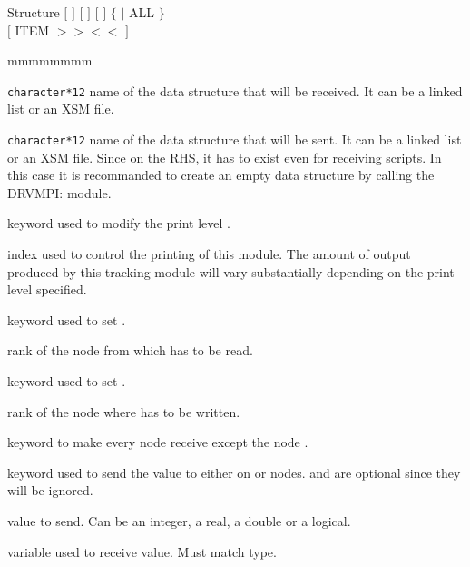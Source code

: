 \begin{DataStructure}{Structure }
$[$  \moc{:=} $]$  $[$  $]$ \moc{::} $[$   $]$     $\{$  $|$ ALL $\}$ \\ $[$ ITEM  $>>$$<<$ $]$ \moc{;}
\end{DataStructure}

\begin{ListeDeDescription}{mmmmmmmm}

\item[\dusa{NAME1}] {\tt character*12} name of the data structure that will be received. It can be a linked list or an XSM file.

\item[\dusa{NAME2}] {\tt character*12} name of the data structure that will be sent. It can be a linked list or an XSM file. Since on the RHS, it has to exist even for receiving scripts. In this case it is recommanded to create an empty data structure  by calling the DRVMPI: module.

\item[\moc{EDIT}] keyword used to modify the print level .

\item[\dusa{iprint}] index used to control the printing of this module. The
amount of output produced by this tracking module will vary substantially
depending on the print level specified.

\item[\moc{FROM}] keyword used to set .

\item[\dusa{iFrom}] rank of the node from which  has to be read.

\item[\moc{TO}] keyword used to set .

\item[\dusa{iTo}] rank of the node where  has to be written.

\item[\moc{ALL}] keyword to make every node receive  except the node .

\item[\moc{ITEM}] keyword used to send the value  to  either on  or  nodes.  and  are optional since they will be ignored.

\item[\dusa{from}] value to send. Can be an integer, a real, a double or a logical.

\item[\dusa{to}] variable used to receive  value. Must match  type.

\end{ListeDeDescription}
